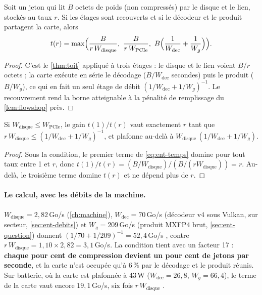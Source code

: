 \begin{proposition}\label{prop:ent-temps}
Soit un jeton qui lit $B$ octets de poids (non compressés) par le disque et le lien, stockés au taux $r$. Si les étages sont recouverts et si le décodeur et le produit partagent la carte, alors
\begin{equation}\label{eq:ent-temps}
t(r) = \max\Bigl( \frac{B}{r\,W_{\mathrm{disque}}},\ \frac{B}{r\,W_{\mathrm{PCIe}}},\ B\Bigl(\frac{1}{W_{\mathrm{dec}}} + \frac{1}{W_g}\Bigr) \Bigr).
\end{equation}
\end{proposition}

\begin{proof}
C'est le \cref{thm:toit} appliqué à trois étages : le disque et le lien voient $B/r$ octets ; la carte exécute en série le décodage ($B/W_{\mathrm{dec}}$ secondes) puis le produit ($B/W_g$), ce qui en fait un seul étage de débit $(1/W_{\mathrm{dec}} + 1/W_g)^{-1}$. Le recouvrement rend la borne atteignable à la pénalité de remplissage du \cref{lem:flowshop} près.
\end{proof}

\begin{corollaire}\label{cor:ent-gain}
Si $W_{\mathrm{disque}} \le W_{\mathrm{PCIe}}$, le gain $t(1)/t(r)$ vaut exactement $r$ tant que $r\,W_{\mathrm{disque}} \le (1/W_{\mathrm{dec}} + 1/W_g)^{-1}$, et plafonne au-delà à $W_{\mathrm{disque}}\,(1/W_{\mathrm{dec}} + 1/W_g)$.
\end{corollaire}

\begin{proof}
Sous la condition, le premier terme de \eqref{eq:ent-temps} domine pour tout taux entre 1 et $r$, donc $t(1)/t(r) = (B/W_{\mathrm{disque}})/(B/(rW_{\mathrm{disque}})) = r$. Au-delà, le troisième terme domine $t(r)$ et ne dépend plus de $r$.
\end{proof}

\paragraph{Le calcul, avec les débits de la machine.} $W_{\mathrm{disque}} = 2{,}82$\,Go/s (\cref{ch:machine}), $W_{\mathrm{dec}} = 70$\,Go/s (décodeur v4 sous Vulkan, sur secteur, \cref{sec:ent-debits}) et $W_g = 209$\,Go/s (produit MXFP4 brut, \cref{sec:ent-question}) donnent $(1/70 + 1/209)^{-1} = 52{,}4$\,Go/s \calc, contre $r\,W_{\mathrm{disque}} = 1{,}10 \times 2{,}82 = 3{,}1$\,Go/s. La condition tient avec un facteur 17 : \textbf{chaque pour cent de compression devient un pour cent de jetons par seconde}, et la carte n'est occupée qu'à 6\,\% par le décodage et le produit réunis. Sur batterie, où la carte est plafonnée à 43\,W ($W_{\mathrm{dec}} = 26{,}8$, $W_g = 66{,}4$), le terme de la carte vaut encore $19{,}1$\,Go/s, six fois $r\,W_{\mathrm{disque}}$ \calc.

